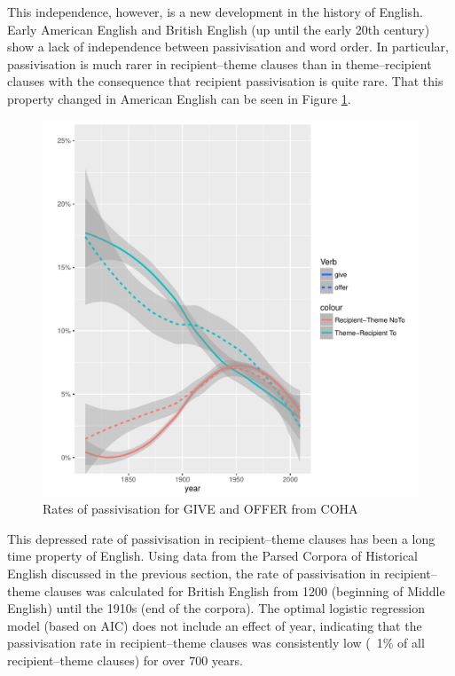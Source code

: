 	This independence, however, is a new development in the history of English. Early American English and British English (up until the early 20th century) show a lack of independence between passivisation and word order. In particular, passivisation is much rarer in recipient--theme clauses than in theme--recipient clauses with the consequence that recipient passivisation is quite rare. That this property changed in American English can be seen in Figure \ref{fig:am-change-pass}.


	\begin{figure}[ht!]
		\includegraphics[width=\linewidth]{../images/am-change-pass}
		\caption{Rates of passivisation for GIVE and OFFER from COHA}
		\label{fig:am-change-pass}
	\end{figure}

	This depressed rate of passivisation in recipient--theme clauses has been a long time property of English. Using data from the Parsed Corpora of Historical English discussed in the previous section, the rate of passivisation in recipient--theme clauses was calculated for British English from 1200 (beginning of Middle English) until the 1910s (end of the corpora). The optimal logistic regression model (based on AIC) does not include an effect of year, indicating that the passivisation rate in recipient--theme clauses was consistently low (~1\% of all recipient--theme clauses) for over 700 years. 

